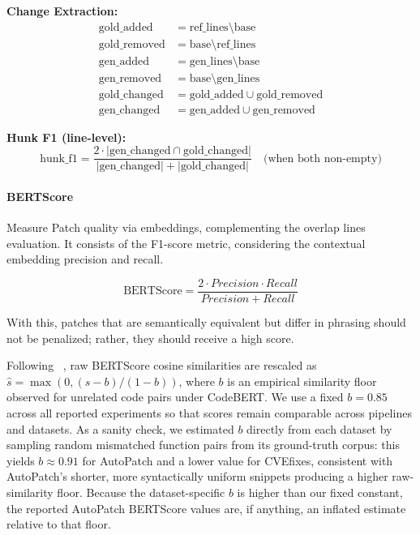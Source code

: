 \noindent \textbf{Change Extraction:}
\begin{align*}
\text{gold\_added} &= \text{ref\_lines} \setminus \text{base} \\
\text{gold\_removed} &= \text{base} \setminus \text{ref\_lines} \\
\text{gen\_added} &= \text{gen\_lines} \setminus \text{base} \\
\text{gen\_removed} &= \text{base} \setminus \text{gen\_lines} \\
\text{gold\_changed} &= \text{gold\_added} \cup \text{gold\_removed} \\
\text{gen\_changed} &= \text{gen\_added} \cup \text{gen\_removed}
\end{align*}

\noindent \textbf{Hunk F1 (line-level):}
\[
\text{hunk\_f1} = \frac{2 \cdot |\text{gen\_changed} \cap \text{gold\_changed}|}{|\text{gen\_changed}| + |\text{gold\_changed}|} \quad \text{(when both non-empty)}
\]

\paragraph{BERTScore} Measure Patch quality via embeddings, complementing the overlap lines evaluation. It consists of the F1-score metric, considering the contextual embedding precision and recall. 

\[
\text{BERTScore} = \frac{2 \cdot Precision \cdot Recall}{Precision + Recall}
\]

With this, patches that are semantically equivalent but differ in phrasing should not be penalized; rather, they should receive a high score.

Following ~\cite{Zhang2020BERTScore}, raw BERTScore cosine similarities are rescaled as $\hat{s} = \max(0, (s - b) / (1 - b))$, 
where $b$ is an empirical similarity floor observed for unrelated code pairs under CodeBERT. We use a fixed $b=0.85$ across all reported experiments so
that scores remain comparable across pipelines and datasets. As a sanity check, we estimated $b$ directly from each dataset by sampling
random mismatched function pairs from its ground-truth corpus: this yields $b\approx0.91$ for AutoPatch and a lower value for CVEfixes, consistent with AutoPatch's shorter, more syntactically uniform snippets producing a higher raw-similarity floor.
 Because the dataset-specific $b$ is higher than our fixed constant, the reported AutoPatch BERTScore values are, if anything, an inflated estimate relative to that floor.

